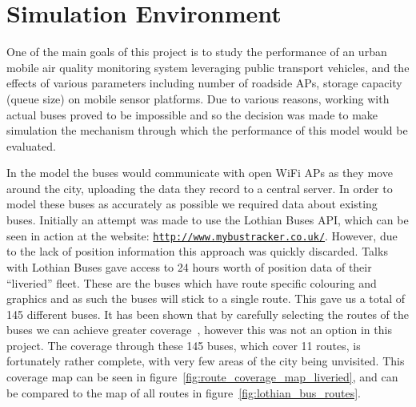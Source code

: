 \chapter{Simulation Environment}\label{simulation}
    
    One of the main goals of this project is to study the performance of an urban mobile air quality monitoring system leveraging public transport vehicles, and the effects of various parameters including number of roadside APs, storage capacity (queue size) on mobile sensor platforms. Due to various reasons, working with actual buses proved to be impossible and so the decision was made to make simulation the mechanism through which the performance of this model would be evaluated. 

    In the model the buses would communicate with open WiFi APs as they move around the city, uploading the data they record to a central server. In order to model these buses as accurately as possible we required data about existing buses. Initially an attempt was made to use the Lothian Buses API, which can be seen in action at the website: \href{http://www.mybustracker.co.uk/}{\nolinkurl{http://www.mybustracker.co.uk/}}. However, due to the lack of position information this approach was quickly discarded. Talks with Lothian Buses gave access to 24 hours worth of position data of their ``liveried'' fleet. These are the buses which have route specific colouring and graphics and as such the buses will stick to a single route. This gave us a total of 145 different buses. It has been shown that by carefully selecting the routes of the buses we can achieve greater coverage~\cite{opensenserouteselection}, however this was not an option in this project. The coverage through these 145 buses, which cover 11 routes, is fortunately rather complete, with very few areas of the city being unvisited. This coverage map can be seen in figure~\ref{fig:route_coverage_map_liveried}, and can be compared to the map of all routes in figure~\ref{fig:lothian_bus_routes}.




